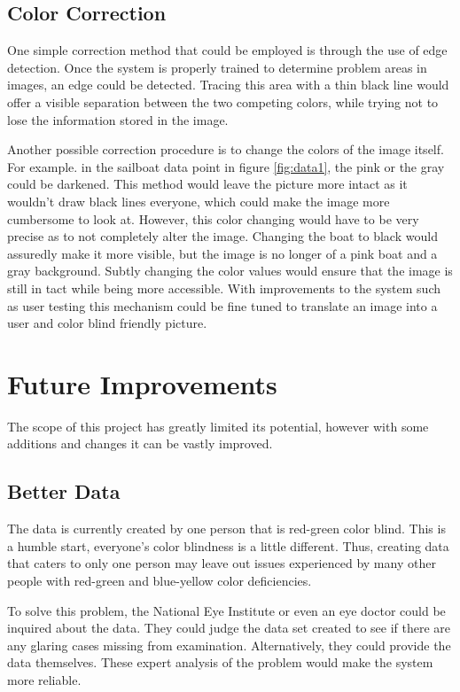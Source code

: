 \documentclass[12pt]{article}
\begin{document}
\subsection{Color Correction}

One simple correction method that could be employed is through the use of edge detection. Once the system is properly trained to determine problem areas in images, an edge could be detected. Tracing this area with a thin black line would offer a visible separation between the two competing colors, while trying not to lose the information stored in the image.

Another possible correction procedure is to change the colors of the image itself. For example. in the sailboat data point in figure \ref{fig:data1}, the pink or the gray could be darkened. This method would leave the picture more intact as it wouldn't draw black lines everyone, which could make the image more cumbersome to look at. However, this color changing would have to be very precise as to not completely alter the image. Changing the boat to black would assuredly make it more visible, but the image is no longer of a pink boat and a gray background. Subtly changing the color values would ensure that the image is still in tact while being more accessible. With improvements to the system such as user testing this mechanism could be fine tuned to translate an image into a user and color blind friendly picture.



\section{Future Improvements}
The scope of this project has greatly limited its potential, however with some additions and changes it can be vastly improved.

\subsection{Better Data}
The data is currently created by one person that is red-green color blind. This is a humble start, everyone's color blindness is a little different. Thus, creating data that caters to only one person may leave out issues experienced by many other people with red-green and blue-yellow color deficiencies.

To solve this problem, the National Eye Institute or even an eye doctor could be inquired about the data. They could judge the data set created to see if there are any glaring cases missing from examination. Alternatively, they could provide the data themselves. These expert analysis of the problem would make the system more reliable.
\end{document}
